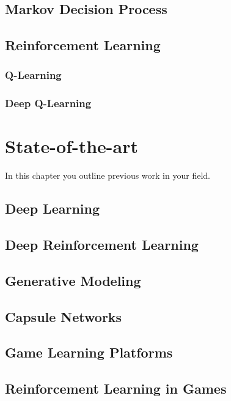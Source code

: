 \documentclass{uia}
\begin{document}
\section{Markov Decision Process}
\label{sec:bg:mdp}

\section{Reinforcement Learning}
\label{sec:bg:rl}


\subsection{Q-Learning}
\label{sec:bg:rl:ql}
\subsection{Deep Q-Learning}
\label{sec:bg:rl:dql}


\chapter{State-of-the-art}
\label{chap:sota}
In this chapter you outline previous work in your field. 

\section{Deep Learning}
\label{sec:sota:nn}

\section{Deep Reinforcement Learning}
\label{sec:sota:rl}


\section{Generative Modeling}
\label{sec:sota:gan}

\section{Capsule Networks}
\label{sec:sota:capsnet}

\section{Game Learning Platforms}
\label{sec:sota:gameenv}

\section{Reinforcement Learning in Games}
\label{sec:sota:games}
\end{document}
